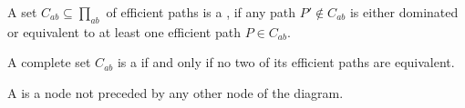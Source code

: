 \begin{defi}
A set $C_{ab}\subseteq\displaystyle\prod_{ab}$ of efficient paths is a , if any path $P'\notin C_{ab}$ is either dominated or equivalent to at least one efficient path $P\in C_{ab}$.
\cite{conf/fedcsis/MalucelliCR12}
\end{defi}

\begin{defi}
A complete set $C_{ab}$ is a  if and only if no two of its efficient paths are equivalent.
\cite{conf/fedcsis/MalucelliCR12}
\end{defi}

\begin{defi}
A  is a node not preceded by any other node of the diagram.
\cite{conf/fedcsis/Kulikowski12}
\end{defi}